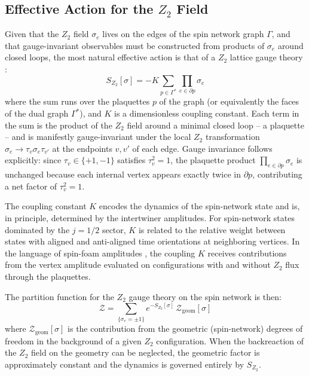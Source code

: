 \documentclass[preprint]{SciPost}
\newcommand{\mc}[1]{\mathcal{#1}}
\theoremstyle{plain} %
\begin{document}
\subsection{Effective Action for the $ Z_2 $ Field}\label{subsec:z2-effective-action}

Given that the $ Z_2 $ field $ \sigma_e $ lives on the edges of the spin network graph $ \Gamma $, and that gauge-invariant observables must be constructed from products of $ \sigma_e $ around closed loops, the most natural effective action is that of a $ Z_2 $ lattice gauge theory \cite{Wegner1971Duality,Kogut1979An-introduction}:
\begin{equation}\label{eqn:z2-gauge-action}
	S_{Z_2}[\sigma] = -K \sum_{p \in \Gamma^*} \prod_{e \in \partial p} \sigma_e
\end{equation}
where the sum runs over the plaquettes $ p $ of the graph (or equivalently the faces of the dual graph $ \Gamma^* $), and $ K $ is a dimensionless coupling constant. Each term in the sum is the product of the $ Z_2 $ field around a minimal closed loop -- a plaquette -- and is manifestly gauge-invariant under the local $ Z_2 $ transformation $ \sigma_e \rightarrow \tau_v \sigma_e \tau_{v'} $ at the endpoints $ v, v' $ of each edge. Gauge invariance follows explicitly: since $ \tau_v \in \{+1,-1\} $ satisfies $ \tau_v^2 = 1 $, the plaquette product $ \prod_{e \in \partial p} \sigma_e $ is unchanged because each internal vertex appears exactly twice in $ \partial p $, contributing a net factor of $ \tau_v^2 = 1 $.

The coupling constant $ K $ encodes the dynamics of the spin-network state and is, in principle, determined by the intertwiner amplitudes. For spin-network states dominated by the $ j = 1/2 $ sector, $ K $ is related to the relative weight between states with aligned and anti-aligned time orientations at neighboring vertices. In the language of spin-foam amplitudes \cite{Perez2013The-Spin-Foam,Dona2020Numerical,Dona2022Asymptotics}, the coupling $ K $ receives contributions from the vertex amplitude evaluated on configurations with and without $ Z_2 $ flux through the plaquettes.

The partition function for the $ Z_2 $ gauge theory on the spin network is then:
\begin{equation}\label{eqn:z2-partition-function}
	\mc{Z} = \sum_{\{\sigma_e = \pm 1\}} e^{-S_{Z_2}[\sigma]} \, \mc{Z}_{\text{geom}}[\sigma]
\end{equation}
where $ \mc{Z}_{\text{geom}}[\sigma] $ is the contribution from the geometric (spin-network) degrees of freedom in the background of a given $ Z_2 $ configuration. When the backreaction of the $ Z_2 $ field on the geometry can be neglected, the geometric factor is approximately constant and the dynamics is governed entirely by $ S_{Z_2} $.
\end{document}
